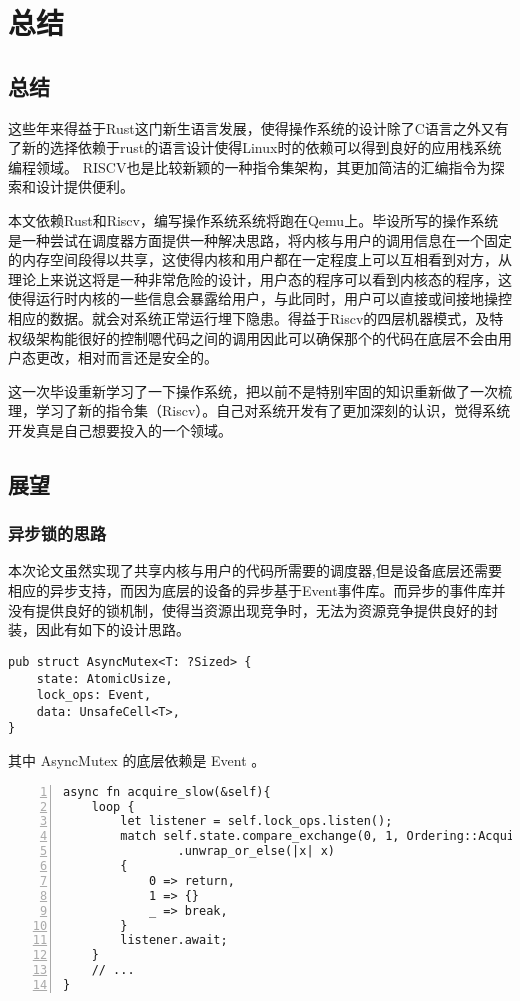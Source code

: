 \chapter{总结}
\label{chap:Summary}
\section{总结}

这些年来得益于Rust这门新生语言发展，使得操作系统的设计除了C语言之外又有了新的选择依赖于rust的语言设计使得Linux时的依赖可以得到良好的应用栈系统编程领域。 RISCV也是比较新颖的一种指令集架构，其更加简洁的汇编指令为探索和设计提供便利。

本文依赖Rust和Riscv，编写操作系统系统将跑在Qemu上。毕设所写的操作系统是一种尝试在调度器方面提供一种解决思路，将内核与用户的调用信息在一个固定的内存空间段得以共享，这使得内核和用户都在一定程度上可以互相看到对方，从理论上来说这将是一种非常危险的设计，用户态的程序可以看到内核态的程序，这使得运行时内核的一些信息会暴露给用户，与此同时，用户可以直接或间接地操控相应的数据。就会对系统正常运行埋下隐患。得益于Riscv的四层机器模式，及特权级架构能很好的控制嗯代码之间的调用因此可以确保那个的代码在底层不会由用户态更改，相对而言还是安全的。

这一次毕设重新学习了一下操作系统，把以前不是特别牢固的知识重新做了一次梳理，学习了新的指令集（Riscv）。自己对系统开发有了更加深刻的认识，觉得系统开发真是自己想要投入的一个领域。

\section{展望}
\subsection{异步锁的思路}

本次论文虽然实现了共享内核与用户的代码所需要的调度器,但是设备底层还需要相应的异步支持，而因为底层的设备的异步基于Event事件库。而异步的事件库并没有提供良好的锁机制，使得当资源出现竞争时，无法为资源竞争提供良好的封装，因此有如下的设计思路。

\begin{lstlisting}[caption=异步锁结构]
pub struct AsyncMutex<T: ?Sized> {
    state: AtomicUsize,
    lock_ops: Event,
    data: UnsafeCell<T>,
}
\end{lstlisting}

其中 AsyncMutex 的底层依赖是 Event 。

\begin{lstlisting}[caption=异步锁的工作机制, numbers=left, label=asyncmutex]
async fn acquire_slow(&self){
    loop {
        let listener = self.lock_ops.listen();
        match self.state.compare_exchange(0, 1, Ordering::Acquire, Ordering::Acquire)
                .unwrap_or_else(|x| x)
        {
            0 => return,
            1 => {}
            _ => break,
        }
        listener.await;
    }
    // ...
}
\end{lstlisting}

